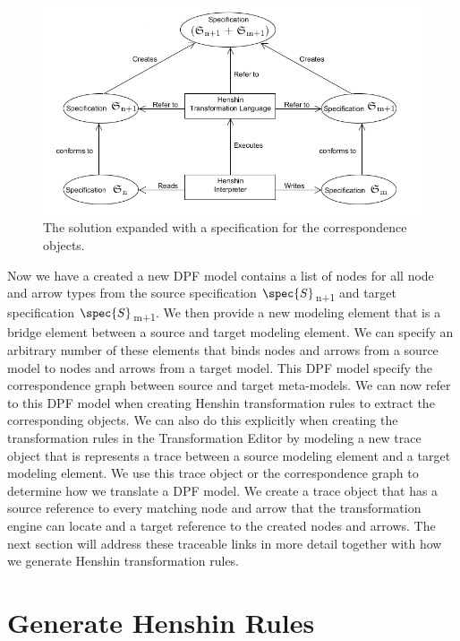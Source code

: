 \begin{figure}[H]
	\centering
	\includegraphics[scale=0.7]{./Figures/TransformationSolution_Correspond.png}
	\caption[Specification for the correspondence objects]
	{The solution expanded with a specification for the correspondence objects.}
	\label{fig:Solution_CorrespondanceObjects}
\end{figure}

Now we have a created a new DPF model contains a list of nodes for all node and
arrow types from the source specification $\spec{S}$\textsubscript{n+1} and
target specification $\spec{S}$\textsubscript{m+1}. We then provide a new
modeling element that is a bridge element between a source and target modeling
element. We can specify an arbitrary number of these elements that binds nodes
and arrows from a source model to nodes and arrows from a target model. This DPF
model specify the correspondence graph between source and target meta-models. We
can now refer to this DPF model when creating Henshin transformation rules to
extract the corresponding objects. We can also do this explicitly when creating
the transformation rules in the Transformation Editor by modeling a new trace
object that is represents a trace between a source modeling element and a
target modeling element. We use this trace object or the correspondence graph to
determine how we translate a DPF model. We create a trace object that has a
source reference to every matching node and arrow that the transformation engine
can locate and a target reference to the created nodes and arrows. The next
section will address these traceable links in more detail together with how we
generate Henshin transformation rules. 


\section{Generate Henshin Rules}

